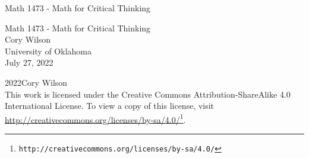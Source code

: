 \documentclass[oneside,10pt,]{book}
\newcommand{\titlepagefont}{\relax}
\begin{document}
\raggedbottom
\frontmatter
\thispagestyle{empty}
{\titlepagefont\centering
\vspace*{0.28\textheight}
{\Huge Math 1473 - Math for Critical Thinking}\\}
\clearpage
\thispagestyle{empty}
{\titlepagefont\centering
\vspace*{0.14\textheight}
{\Huge Math 1473 - Math for Critical Thinking}\\[3\baselineskip]
{\Large Cory Wilson}\\[0.5\baselineskip]
{\Large University of Oklahoma}\\[3\baselineskip]
{\Large July 27, 2022}\\}
\clearpage
\thispagestyle{empty}
\hypertarget{x:colophon:colophon}{}
\noindent\textcopyright{}2022\quad{}Cory Wilson\\[0.5\baselineskip]
This work is licensed under the Creative Commons Attribution-ShareAlike 4.0 International License. To view a copy of this license, visit \href{http://creativecommons.org/licenses/by-sa/4.0/}{http:\slash{}\slash{}creativecommons.org\slash{}licenses\slash{}by-sa\slash{}4.0\slash{}}\footnote{\nolinkurl{http://creativecommons.org/licenses/by-sa/4.0/}\label{g:fn:idp1505389848}}.\par\medskip
{}
\null\clearpage
\setcounter{tocdepth}{1}
\renewcommand*\contentsname{Contents}
\tableofcontents
\mainmatter
%
%
\typeout{************************************************}
\typeout{************************************************}
%
\end{document}

